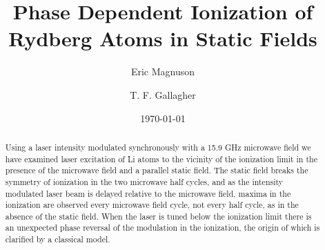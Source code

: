 \documentclass[aps,pra,preprint,groupedaddress]{revtex4-1}
\begin{document}
\title{Phase Dependent Ionization of Rydberg Atoms in Static Fields}


\author{Eric Magnuson}
\author{T. F. Gallagher}


\date{\today}

\begin{abstract}
Using a laser intensity modulated synchronously with a 15.9 GHz microwave field we have examined laser excitation of Li atoms to the vicinity of the ionization limit in the presence of the microwave field and a parallel static field. The static field breaks the symmetry of ionization in the two microwave half cycles, and as the intensity modulated laser beam is delayed relative to the microwave field, maxima in the ionization are observed every microwave field cycle, not every half cycle, as in the absence of the static field. When the laser is tuned below the ionization limit there is an unexpected phase reversal of the modulation in the ionization, the origin of which is clarified by a classical model.

\end{abstract}

\pacs{}

\maketitle
\end{document}

